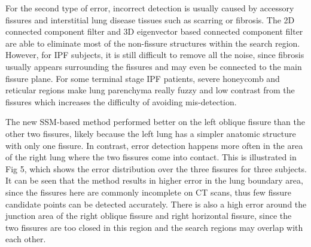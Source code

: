 {For the second type of error, incorrect detection is usually caused by accessory fissures and interstitial lung disease tissues such as scarring or fibrosis. The 2D connected component filter and 3D eigenvector based connected component filter are able to eliminate most of the non-fissure structures within the search region. However, for IPF subjects, it is still difficult to remove all the noise, since fibrosis usually appears surrounding the fissures and may even be connected to the main fissure plane. For some terminal stage IPF patients, severe honeycomb and reticular regions make lung parenchyma really fuzzy and low contrast from the fissures which increases the difficulty of avoiding mis-detection.

The new SSM-based method performed better on the left oblique fissure than the other two fissures, likely because the left lung has a simpler anatomic structure with only one fissure. In contrast, error detection happens more often in the area of the right lung where the two fissures come into contact. This is illustrated in Fig 5, which shows the error distribution over the three fissures for three subjects. It can be seen that the method results in higher error in the lung boundary area, since the fissures here are commonly incomplete on CT scans, thus few fissure candidate points can be detected accurately. There is also a high error around the junction area of the right oblique fissure and right horizontal fissure, since the two fissures are too closed in this region and the search regions may overlap with each other.

}
